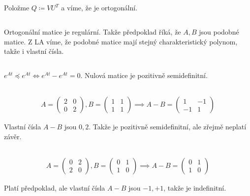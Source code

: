 \documentclass[12pt, a4paper]{article}
\begin{document}
Položme $Q \coloneqq V U ^T$ a víme, že je ortogonální.

\subsection{}
Ortogonální matice je regulární. Takže předpoklad říká, že $A, B$ jsou podobné matice. Z LA víme, že podobné matice mají stejný charakteristický polynom, takže i vlastní čísla.

\subsection{}
$e^{At} \preceq e^{At} \iff e^{At}-e^{At} = 0$. Nulová matice je pozitivně semidefinitní.

\subsection{}
\begin{gather*}
A = \begin{pmatrix}
2 & 0\\
0 & 2
\end{pmatrix},
B = \begin{pmatrix}
1 & 1\\
1 & 1
\end{pmatrix} \implies
A-B = \begin{pmatrix}
1 & -1\\
-1 & 1
\end{pmatrix}
\end{gather*}

Vlastní čísla $A-B$ jsou $0, 2$. Takže je pozitivně semidefinitní, ale zřejmě neplatí závěr.

\subsection{}
\begin{gather*}
A = \begin{pmatrix}
0 & 2\\
2 & 0
\end{pmatrix},
B = \begin{pmatrix}
0 & 1\\
1 & 0
\end{pmatrix} \implies
A-B = \begin{pmatrix}
0 & 1\\
1 & 0
\end{pmatrix}
\end{gather*}

Platí předpoklad, ale vlastní čísla $A-B$ jsou $-1,+1$, takže je indefinitní.
\end{document}
